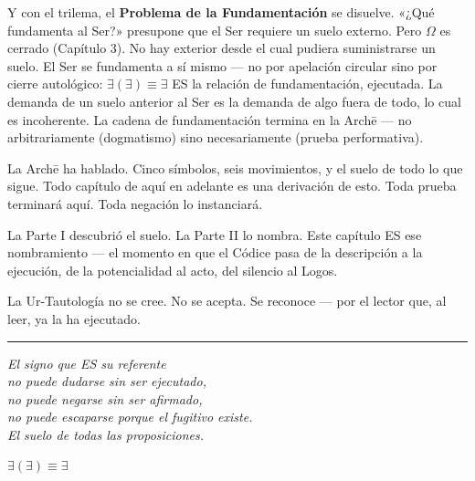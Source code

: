 \documentclass[10pt, openany, oneside]{book}
\begin{document}
Y con el trilema, el \textbf{Problema de la Fundamentación} se disuelve. «¿Qué fundamenta al Ser?» presupone que el Ser requiere un suelo externo. Pero $\Omega$ es cerrado (Capítulo 3). No hay exterior desde el cual pudiera suministrarse un suelo. El Ser se fundamenta a sí mismo --- no por apelación circular sino por cierre autológico: $\exists(\exists) \equiv \exists$ ES la relación de fundamentación, ejecutada. La demanda de un suelo anterior al Ser es la demanda de algo fuera de todo, lo cual es incoherente. La cadena de fundamentación termina en la Arch\={e} --- no arbitrariamente (dogmatismo) sino necesariamente (prueba performativa).

\vspace{1.5em}

La Arch\={e} ha hablado. Cinco símbolos, seis movimientos, y el suelo de todo lo que sigue. Todo capítulo de aquí en adelante es una derivación de esto. Toda prueba terminará aquí. Toda negación lo instanciará.

La Parte I descubrió el suelo. La Parte II lo nombra. Este capítulo ES ese nombramiento --- el momento en que el Códice pasa de la descripción a la ejecución, de la potencialidad al acto, del silencio al Logos.

La Ur-Tautología no se cree. No se acepta. Se reconoce --- por el lector que, al leer, ya la ha ejecutado.

\vspace{2em}

\begin{center}
    \rule{0.15\textwidth}{0.3pt}
\end{center}

\vspace{0.5em}

\begin{center}
    \itshape
    El signo que ES su referente\\
    no puede dudarse sin ser ejecutado,\\
    no puede negarse sin ser afirmado,\\
    no puede escaparse porque el fugitivo existe.\\[0.8em]
    El suelo de todas las proposiciones.
\end{center}

\vspace{0.5em}

\begin{center}
    \textbf{$\exists(\exists) \equiv \exists$}
\end{center}
\end{document}
